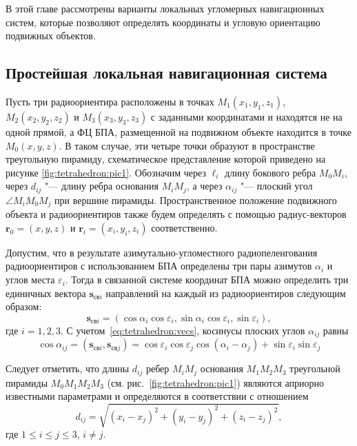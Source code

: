 \documentclass[../main.tex]{subfiles}
\begin{document}
\renewcommand{\figurename}{Рисунок}

В этой главе рассмотрены варианты локальных угломерных навигационных систем, которые позволяют определять координаты и угловую ориентацию подвижных объектов.

%
%
%
\subsection{Простейшая локальная навигационная система}\label{sec:lunx_simple}
Пусть три радиоориентира расположены в точках $M_1\left(x_1, y_1, z_1\right)$, $M_2\left(x_2, y_2, z_2\right)$ и $M_3\left(x_3, y_3, z_3\right)$ с заданными координатами и находятся не на одной прямой, а ФЦ БПА, размещенной на подвижном объекте находится в точке $M_0\left(x, y, z\right)$. В таком случае, эти четыре точки образуют в пространстве треугольную пирамиду, схематическое представление которой приведено на рисунке \ref{fig:tetrahedron:pic1}. Обозначим через $\ell_i$ длину бокового ребра $M_0M_i$, через $d_{ij}$ "--- длину ребра основания $M_iM_j$, а через $\alpha_{ij}$ "--- плоский угол $\angle M_iM_0M_j$ при вершине пирамиды. Пространственное положение подвижного объекта и радиоориентиров также будем определять с помощью радиус-векторов $\mathbf{r}_0 = \left(x, y, z\right)$ и $\mathbf{r}_i = \left(x_i, y_i, z_i\right)$ соответственно.

Допустим, что в результате азимутально-угломестного радиопеленгования радиоориентиров с использованием БПА определены три пары азимутов $\alpha_{i}$ и углов места $\varepsilon_{i}$. Тогда в связанной системе координат БПА можно определить три единичных вектора $\mathbf{s}_{\text{св}i}$ направлений на каждый из радиоориентиров следующим образом:
\begin{equation}\label{eq:tetrahedron:vecs}
    \mathbf{s}_{\text{св}i} = \left(\cos\alpha_i \cos\varepsilon_i, \sin\alpha_i\cos\varepsilon_i, \sin\varepsilon_i\right),
\end{equation}
где $i = 1,2,3$. С учетом~\eqref{eq:tetrahedron:vecs}, косинусы плоских углов $\alpha_{ij}$ равны
\begin{equation}
    \cos\alpha_{ij} = \left(\mathbf{s}_{\text{св}i}, \mathbf{s}_{\text{св}j}\right) =
    \cos\varepsilon_i \cos\varepsilon_j \cos\left(\alpha_i - \alpha_j\right) + \sin\varepsilon_i \sin\varepsilon_j
\end{equation}

Следует отметить, что длины $d_{ij}$ ребер $M_i M_j$ основания $M_1 M_2 M_3$ треугольной пирамиды $M_0 M_1 M_2 M_3$ (см. рис.~\ref{fig:tetrahedron:pic1}) являются априорно известными параметрами и определяются в соответствии с отношением
\begin{equation*}
  d_{ij} = \sqrt{\left(x_i - x_j\right)^2 + \left(y_i - y _j\right)^2 + \left(z_i - z_j\right)^2},
\end{equation*}
где $1 \le i \le j \le 3$, $i \ne j$.
\end{document}
